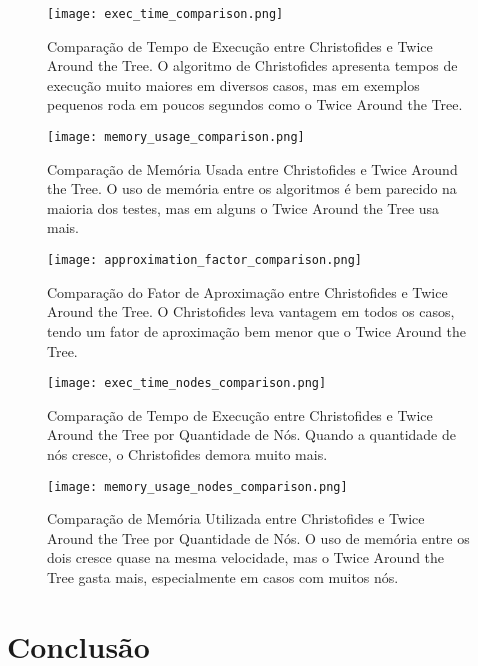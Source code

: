 \documentclass[12pt]{article}
\begin{document}
\begin{figure}[ht]
\centering
\texttt{[image: exec\_time\_comparison.png]}
\caption{Comparação de Tempo de Execução entre Christofides e Twice Around the Tree. O algoritmo de Christofides apresenta tempos de execução muito maiores em diversos casos, mas em exemplos pequenos roda em poucos segundos como o Twice Around the Tree.}
\label{fig:execTimeComparison}
\end{figure}

\begin{figure}[ht]
\centering
\texttt{[image: memory\_usage\_comparison.png]}
\caption{Comparação de Memória Usada entre Christofides e Twice Around the Tree. O uso de memória entre os algoritmos é bem parecido na maioria dos testes, mas em alguns o Twice Around the Tree usa mais.}
\label{fig:memoryUsageComparison}
\end{figure}

\begin{figure}[ht]
\centering
\texttt{[image: approximation\_factor\_comparison.png]}
\caption{Comparação do Fator de Aproximação entre Christofides e Twice Around the Tree. O Christofides leva vantagem em todos os casos, tendo um fator de aproximação bem menor que o Twice Around the Tree.}
\label{fig:approximationFactorComparison}
\end{figure}

\begin{figure}[ht]
\centering
\texttt{[image: exec\_time\_nodes\_comparison.png]}
\caption{Comparação de Tempo de Execução entre Christofides e Twice Around the Tree por Quantidade de Nós. Quando a quantidade de nós cresce, o Christofides demora muito mais.}
\label{fig:execTimeNodesComparison}
\end{figure}

\begin{figure}[ht]
\centering
\texttt{[image: memory\_usage\_nodes\_comparison.png]}
\caption{Comparação de Memória Utilizada entre Christofides e Twice Around the Tree por Quantidade de Nós. O uso de memória entre os dois cresce quase na mesma velocidade, mas o Twice Around the Tree gasta mais, especialmente em casos com muitos nós.}
\label{fig:memoryUsageNodesComparison}
\end{figure}
\clearpage
\section{Conclusão}
\end{document}
